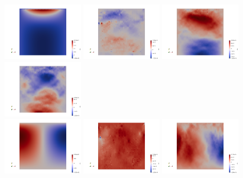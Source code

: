 \begin{center}
\includegraphics[width=3.4cm]{python_codes/fieldstone_87/results/experiment_00/du_00}
\includegraphics[width=3.4cm]{python_codes/fieldstone_87/results/experiment_00/du_01}
\includegraphics[width=3.4cm]{python_codes/fieldstone_87/results/experiment_00/du_02}
\includegraphics[width=3.4cm]{python_codes/fieldstone_87/results/experiment_00/du_03}\\
\includegraphics[width=3.4cm]{python_codes/fieldstone_87/results/experiment_00/dv_00}
\includegraphics[width=3.4cm]{python_codes/fieldstone_87/results/experiment_00/dv_01}
\includegraphics[width=3.4cm]{python_codes/fieldstone_87/results/experiment_00/dv_02}

\end{center}
